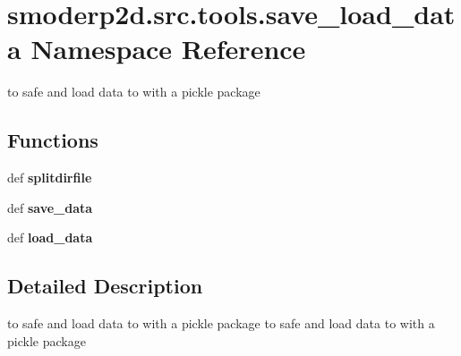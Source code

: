 \hypertarget{namespacesmoderp2d_1_1src_1_1tools_1_1save__load__data}{\section{smoderp2d.\-src.\-tools.\-save\-\_\-load\-\_\-data Namespace Reference}
\label{namespacesmoderp2d_1_1src_1_1tools_1_1save__load__data}
}


to safe and load data to with a pickle package  


\subsection*{Functions}
\begin{DoxyCompactItemize}
\item 
\hypertarget{namespacesmoderp2d_1_1src_1_1tools_1_1save__load__data_af2f961a59bbb6a48a2763afb8f109061}{def {\bfseries splitdirfile}}\label{namespacesmoderp2d_1_1src_1_1tools_1_1save__load__data_af2f961a59bbb6a48a2763afb8f109061}

\item 
\hypertarget{namespacesmoderp2d_1_1src_1_1tools_1_1save__load__data_ad1f51c6a035114eb40aaf40877c7453b}{def {\bfseries save\-\_\-data}}\label{namespacesmoderp2d_1_1src_1_1tools_1_1save__load__data_ad1f51c6a035114eb40aaf40877c7453b}

\item 
\hypertarget{namespacesmoderp2d_1_1src_1_1tools_1_1save__load__data_a75ab43f11bf35c45c074ef840eea7a6c}{def {\bfseries load\-\_\-data}}\label{namespacesmoderp2d_1_1src_1_1tools_1_1save__load__data_a75ab43f11bf35c45c074ef840eea7a6c}

\end{DoxyCompactItemize}


\subsection{Detailed Description}
to safe and load data to with a pickle package to safe and load data to with a pickle package 